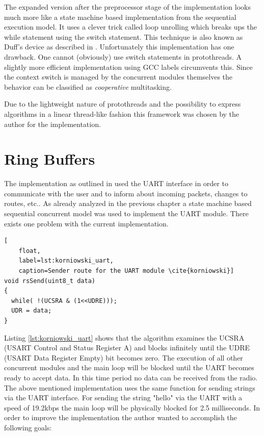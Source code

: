 The expanded version after the preprocessor stage of the implementation looks much more like a state machine based implementation from the sequential execution model. It uses a clever trick called loop unrolling \cite{abrash} which breaks ups the while statement using the switch statement. This technique is also known as Duff's device as described in \cite{duff}. Unfortunately this implementation has one drawback. One cannot (obviously) use switch statements in protothreads. A slightly more efficient implementation using GCC labels circumvents this. Since the context switch is managed by the concurrent modules themselves the behavior can be classified as \emph{cooperative} multitasking.

Due to the lightweight nature of protothreads and the possibility to express algorithms in a linear thread-like fashion this framework was chosen by the author for the implementation.

\section{Ring Buffers}%
The implementation as outlined in \cite{korniowski} used the UART interface in order to communicate with the user and to inform about incoming packets, changes to routes, etc.. As already analyzed in the previous chapter a state machine based sequential concurrent model was used to implement the UART module. There exists one problem with the current implementation.

\begin{lstlisting}[
	float,
	label=lst:korniowski_uart,
	caption=Sender route for the UART module \cite{korniowski}]
void rsSend(uint8_t data)
{
  while( !(UCSRA & (1<<UDRE)));
  UDR = data;
}
\end{lstlisting}

Listing \ref{lst:korniowski_uart} shows that the algorithm examines the UCSRA (USART Control and Status Register A) and blocks infinitely until the UDRE (USART Data Register Empty) bit becomes zero. The execution of all other concurrent modules and the main loop will be blocked until the UART becomes ready to accept data. In this time period no data can be received from the radio. The above mentioned implementation uses the same function for sending strings via the UART interface. For sending the string "hello" via the UART with a speed of 19.2kbps the main loop will be physically blocked for 2.5 milliseconds. In order to improve the implementation the author wanted to accomplish the following goals:

